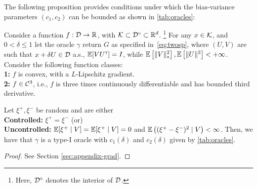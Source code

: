 The following proposition provides conditions under which the bias-variance parameters $(c_1,c_2)$ can be bounded as shown in \cref{tab:oracles}:
\begin{proposition}
\label{prop:grad-spsa}
Consider a function $f:\mathcal{D} \to \mathbb{R}$, with $\mathcal{K} \subset \mathcal{D}^\circ \subset \mathbb{R}^d$.%
\footnote{Here, $\mathcal{D}^\circ$ denotes the interior of $\mathcal{D}$.}
For any $x \in \mathcal{K}$, and $0< \delta \le 1$ let the oracle $\gamma$ return $G$ as specified in~\eqref{eq:twosp},
where $(U,V)$ are such that $x+\delta U \in \mathcal{D}$ a.s.,
$\mathbb{E}[V U^\mathsf{\scriptscriptstyle T}] = I$, while
$\mathbb{E}\left[\|V\|_*^2\right], \mathbb{E}\left[ \|U\|^3 \right]<+\infty$.
Consider the following function classes:\\
\textbf{1:} $f$ is convex, with a $L$-Lipschitz gradient.\\
\textbf{2:} $f \in \mathcal{C}^3$, i.e., $f$ is three times continuously differentiable and has bounded third derivative.

Let $\xi^+, \xi^-$ be  random and are either \\
\textbf{Controlled:} $\xi^+= \xi^-$ (or)  \\
\textbf{Uncontrolled:} $\mathbb{E}[\xi^+ \mid V] = \mathbb{E}[\xi^+ \mid V] =0$ and $\mathbb{E} \left( (\xi^{+} - \xi^-)^{2} \mid V\right) < \infty$.
\fi
Then, we have that $\gamma$ is a type-I oracle with $c_1(\delta)$ and $c_2(\delta)$ given by \cref{tab:oracles}.
\end{proposition}
\begin{proof}
See Section \ref{sec:appendix-grad}.
\end{proof}


